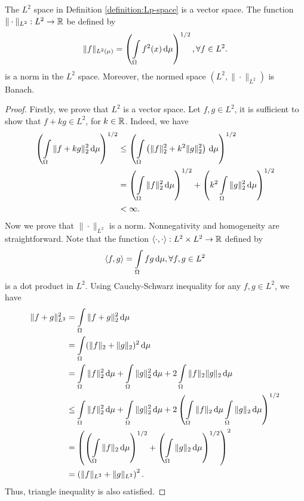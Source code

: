 \begin{theorem}
  \label{theorem:L2-is-Banach}
  The $L^2$ space in Definition \ref{definition:Lp-space} is a vector space. The function $\|\cdot\|_{L^2} : L^2\to\mathbb{R}$ be defined by
  $$\|f\|_{L^2(\mu)}=\left(\int\limits_\Omega f^2(x)\,\mathrm{d} \mu\right)^{1/2}, \forall f\in L^2.$$
  is a norm in the $L^2$ space. Moreover, the normed space $(L^2, \|\cdot\|_{L^2})$ is Banach.
\end{theorem}

\begin{proof}
  Firstly, we prove that $L^2$ is a vector space. Let $f,g \in L^2$, it is sufficient to show that $f+kg\in L^2$, for $k\in\mathbb{R}$. Indeed, we have
  \begin{align*}
    \left(\int\limits_\Omega \|f + kg\|^2_2\,\mathrm{d} \mu\right)^{1/2}
     & \le \left(\int\limits_\Omega \left(\|f\|^2_2 + k^2\|g\|^2_2\right)\,\mathrm{d} \mu\right)^{1/2}                               \\
     & = \left(\int\limits_\Omega \|f\|^2_2\,\mathrm{d} \mu\right)^{1/2}  + \left(k^2\int\limits_\Omega \|g\|^2_2\,\mathrm{d} \mu\right)^{1/2} \\
     & < \infty.
  \end{align*}
  Now we prove that $\|\cdot\|_{L^2}$ is a norm. Nonnegativity and homogeneity are straightforward. Note that the function
  $\langle \cdot, \cdot\rangle : L^2 \times L^2\to \mathbb{R}$ defined by
  \begin{equation}
    \langle f,g \rangle = \int\limits_\Omega fg \,\mathrm{d} \mu, \forall f,g\in L^2
  \end{equation}
  is a dot product in $L^2$. Using Cauchy-Schwarz inequality for any $f,g\in L^2$, we have
  \begin{align*}
    \|f + g\|_{L^2}^2
     & = \int\limits_\Omega \|f + g\|^2_2\,\mathrm{d} \mu                                                                                                                             \\
     & = \int\limits_\Omega (\|f\|_2 +\|g\|_2)^2\,\mathrm{d} \mu                                                                                                                      \\
     & = \int\limits_\Omega \|f\|_2^2\,\mathrm{d} \mu + \int\limits_\Omega \|g\|_2^2\,\mathrm{d} \mu + 2\int\limits_\Omega \|f\|_2\|g\|_2\,\mathrm{d} \mu                                                 \\
     & \le  \int\limits_\Omega \|f\|_2^2\,\mathrm{d} \mu + \int\limits_\Omega \|g\|_2^2\,\mathrm{d} \mu + 2\left(\int\limits_\Omega \|f\|_2\,\mathrm{d} \mu \int\limits_\Omega \|g\|_2\,\mathrm{d} \mu\right)^{1/2} \\
     & = \left( \left(\int\limits_\Omega \|f\|_2\,\mathrm{d} \mu\right)^{1/2} + \left(\int\limits_\Omega \|g\|_2\,\mathrm{d} \mu\right)^{1/2} \right)^2                                         \\
     & = \left(\|f\|_{L^2} + \|g\|_{L^2}\right)^2.
  \end{align*}
  Thus, triangle inequality is also satisfied.


\end{proof}
